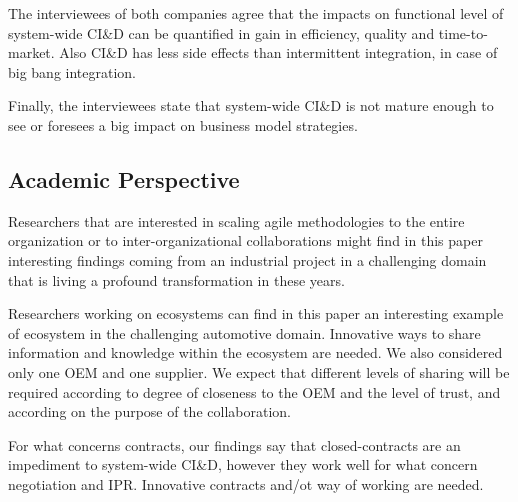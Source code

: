 The interviewees of both companies agree that the impacts on functional level of system-wide CI\&D %
can be quantified in gain in efficiency, quality and time-to-market. Also CI\&D has less side effects than intermittent integration, in case of big bang integration.  

Finally, the interviewees state that system-wide CI\&D is not mature enough to see or foresees a big impact on business model strategies. 

\subsection{Academic Perspective}

Researchers that are interested in scaling agile methodologies to the entire organization or to inter-organizational collaborations might find in this paper interesting findings coming from an industrial project in a challenging domain that is living a profound transformation in these years. 

Researchers working on ecosystems can find in this paper an interesting example of ecosystem in the challenging automotive domain. Innovative ways to share information and knowledge within the ecosystem are needed. We also considered only one OEM and one supplier. We expect that different levels of sharing will be required according to degree of closeness to the OEM and the level of trust, and according on the purpose of the collaboration.

For what concerns contracts, our findings say that closed-contracts are an impediment to system-wide CI\&D, however they work well for what concern negotiation and IPR. Innovative contracts and/ot way of working are needed.

% 


